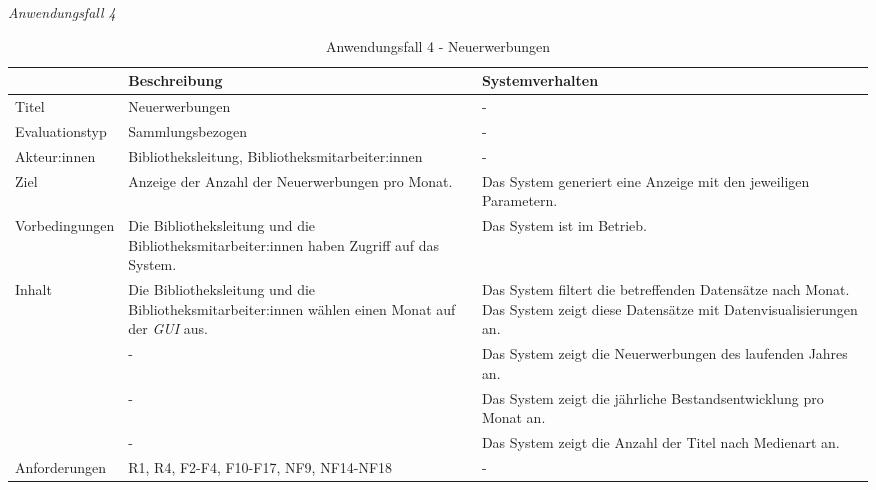 \newpage
\noindent
\textit{Anwendungsfall 4}

\begingroup
\setlength{\tabcolsep}{10pt} %
\renewcommand{\arraystretch}{1.25} 
\begin{table}[h]
    \centering
    \begin{adjustbox}{max width=\textwidth}
    \begin{tabular}{lp{7.0cm}p{7.0cm}}
       \toprule
       \textbf{}          & \textbf{Beschreibung} &\textbf{Systemverhalten}\\
       \midrule
        Titel                            &Neuerwerbungen& -\\
        Evaluationstyp                   &Sammlungsbezogen                   & -\\
        Akteur:innen                     &Bibliotheksleitung, Bibliotheksmitarbeiter:innen& -\\
        Ziel                             &Anzeige der Anzahl der Neuerwerbungen pro Monat.& Das System generiert eine Anzeige mit den jeweiligen Parametern.\\
        Vorbedingungen                   &Die Bibliotheksleitung und die Bibliotheksmitarbeiter:innen haben Zugriff auf das System.& Das System ist im Betrieb.\\
        Inhalt                           &Die Bibliotheksleitung und die Bibliotheksmitarbeiter:innen wählen einen Monat auf der \textit{\acrshort{GUI}} aus.& Das System filtert die betreffenden Datensätze nach Monat. Das System zeigt diese Datensätze mit Datenvisualisierungen an.\\
                                         &-&Das System zeigt die Neuerwerbungen des laufenden Jahres an.\\
                                         &-&Das System zeigt die jährliche Bestandsentwicklung pro Monat an.\\
                                         &-&Das System zeigt die Anzahl der Titel nach Medienart an.\\

        Anforderungen                   &R1, R4, F2-F4, F10-F17, NF9, NF14-NF18& -\\
        \bottomrule
    \end{tabular}
    \end{adjustbox}
    \caption{%
    Anwendungsfall 4 - Neuerwerbungen    }
    \label{tab:AF_Neuerwerbungen}
    \end{table}
